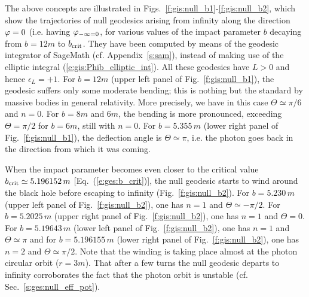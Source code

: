 The above concepts are illustrated in Figs.~\ref{f:gis:null_b1}-\ref{f:gis:null_b2},
which show the trajectories
of null geodesics arising from infinity along the
direction $\varphi=0$ (i.e. having $\varphi_{-\infty=0}$, for various values of the
impact parameter $b$ decaying from $b=12 m$ to $b_{\rm crit}$.
They have been computed by means of the geodesic integrator
of \textsf{SageMath} (cf. Appendix~\ref{s:sam}), instead of making use
of the elliptic integral (\ref{e:gis:Phib_elliptic_int}).
All these geodesics have $L>0$ and hence $\epsilon_L = +1$.
For $b=12 m$ (upper left panel of Fig.~\ref{f:gis:null_b1}),
the geodesic suffers only some moderate bending; this is nothing but the standard
 by massive bodies in
general relativity. More precisely, we have in this case $\Theta\simeq \pi/6$ and $n=0$.
For $b=8 m$ and $6 m$, the bending is more pronounced,
exceeding $\Theta = \pi/2$ for $b=6 m$, still with $n=0$. For $b=5.355\, m$ (lower right panel of Fig.~\ref{f:gis:null_b1}), the deflection angle is $\Theta\simeq\pi$, i.e. the photon goes back in the direction
from which it was coming.

When the impact parameter becomes even closer to the critical value
$b_{\rm crit}\simeq 5.196152\, m$ [Eq.~(\ref{e:ges:b_crit})],
the null geodesic starts to wind around the black hole before escaping
to infinity (Fig.~\ref{f:gis:null_b2}).
For $b=5.230\, m$ (upper left panel of Fig.~\ref{f:gis:null_b2}), one has
$n=1$ and $\Theta\simeq -\pi/2$.
For $b=5.2025\, m$ (upper right panel of Fig.~\ref{f:gis:null_b2}), one has
$n=1$ and $\Theta=0$. For $b=5.19643\, m$ (lower left panel
of Fig.~\ref{f:gis:null_b2}), one has
$n=1$ and $\Theta\simeq \pi$ and for $b=5.196155\, m$ (lower right panel of Fig.~\ref{f:gis:null_b2}), one has $n=2$ and
$\Theta\simeq \pi/2$.
Note that the winding is taking place
almost at the photon circular orbit ($r=3m$). That after a few turns the null geodesic
departs to infinity corroborates the fact that the photon orbit is unstable
(cf. Sec.~\ref{s:ges:null_eff_pot}).

